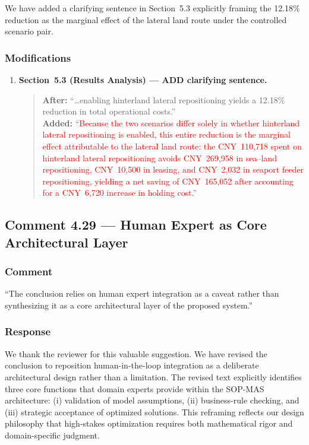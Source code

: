 \documentclass[11pt,a4paper]{article}
\begin{document}
We have added a clarifying sentence in Section~5.3 explicitly framing the 12.18\% reduction as the marginal effect of the lateral land route under the controlled scenario pair.

\subsubsection{Modifications}
\begin{enumerate}
\item \textbf{Section~5.3 (Results Analysis) --- ADD clarifying sentence.}
\begin{quote}
\textbf{After:} ``\ldots enabling hinterland lateral repositioning yields a 12.18\% reduction in total operational costs.''\\[4pt]
\textbf{Added:} ``\textcolor{red}{Because the two scenarios differ solely in whether hinterland lateral repositioning is enabled, this entire reduction is the marginal effect attributable to the lateral land route: the CNY~110,718 spent on hinterland lateral repositioning avoids CNY~269,958 in sea--land repositioning, CNY~10,500 in leasing, and CNY~2,032 in seaport feeder repositioning, yielding a net saving of CNY~165,052 after accounting for a CNY~6,720 increase in holding cost.}''
\end{quote}
\end{enumerate}

\subsection{Comment 4.29 --- Human Expert as Core Architectural Layer}

\subsubsection{Comment}
``The conclusion relies on human expert integration as a caveat rather than synthesizing it as a core architectural layer of the proposed system.''

\subsubsection{Response}
We thank the reviewer for this valuable suggestion. We have revised the conclusion to reposition human-in-the-loop integration as a deliberate architectural design rather than a limitation. The revised text explicitly identifies three core functions that domain experts provide within the SOP-MAS architecture: (i) validation of model assumptions, (ii) business-rule checking, and (iii) strategic acceptance of optimized solutions. This reframing reflects our design philosophy that high-stakes optimization requires both mathematical rigor and domain-specific judgment.
\end{document}

